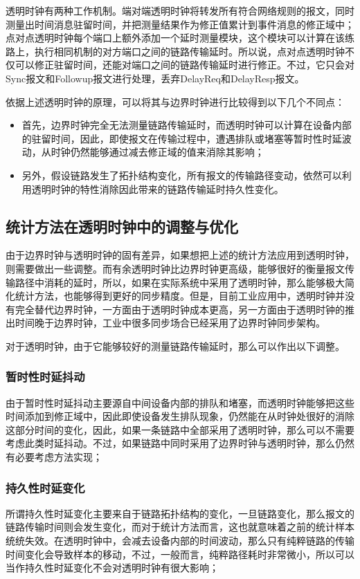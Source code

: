 透明时钟有两种工作机制。端对端透明时钟将转发所有符合网络规则的报文，同时测量出时间消息驻留时间，并把测量结果作为修正值累计到事件消息的修正域中；点对点透明时钟每个端口上额外添加一个延时测量模块，这个模块可以计算在该练路上，执行相同机制的对方端口之间的链路传输延时。所以说，点对点透明时钟不仅可以修正驻留时间，还能对端口之间的链路传输延时进行修正。不过，它只会对Sync报文和Followup报文进行处理，丢弃DelayReq和DelayResp报文。

依据上述透明时钟的原理，可以将其与边界时钟进行比较得到以下几个不同点：
\begin{itemize}[noitemsep,topsep=0pt,parsep=0pt,partopsep=0pt]
  \item 首先，边界时钟完全无法测量链路传输延时，而透明时钟可以计算在设备内部的驻留时间，因此，即使报文在传输过程中，遭遇排队或堵塞等暂时性时延波动，从时钟仍然能够通过减去修正域的值来消除其影响；
  \item 另外，假设链路发生了拓扑结构变化，所有报文的传输路径变动，依然可以利用透明时钟的特性消除因此带来的链路传输延时持久性变化。
\end{itemize}

\subsection{统计方法在透明时钟中的调整与优化}
由于边界时钟与透明时钟的固有差异，如果想把上述的统计方法应用到透明时钟，则需要做出一些调整。而有余透明时钟比边界时钟更高级，能够很好的衡量报文传输路径中消耗的延时，所以，如果在实际系统中采用了透明时钟，那么能够极大简化统计方法，也能够得到更好的同步精度。但是，目前工业应用中，透明时钟并没有完全替代边界时钟，一方面由于透明时钟成本更高，另一方面由于透明时钟的推出时间晚于边界时钟，工业中很多同步场合已经采用了边界时钟同步架构。

对于透明时钟，由于它能够较好的测量链路传输延时，那么可以作出以下调整。
\subsubsection{暂时性时延抖动}
由于暂时性时延抖动主要源自中间设备内部的排队和堵塞，而透明时钟能够把这些时间添加到修正域中，因此即使设备发生排队现象，仍然能在从时钟处很好的消除这部分时间的变化，因此，如果一条链路中全部采用了透明时钟，那么可以不需要考虑此类时延抖动。不过，如果链路中同时采用了边界时钟与透明时钟，那么仍然有必要考虑方法实现；

\subsubsection{持久性时延变化}
所谓持久性时延变化主要来自于链路拓扑结构的变化，一旦链路变化，那么报文的链路传输时间则会发生变化，而对于统计方法而言，这也就意味着之前的统计样本统统失效。在透明时钟中，会减去设备内部的时间波动，那么只有纯粹链路的传输时间变化会导致样本的移动，不过，一般而言，纯粹路径耗时非常微小，所以可以当作持久性时延变化不会对透明时钟有很大影响；

